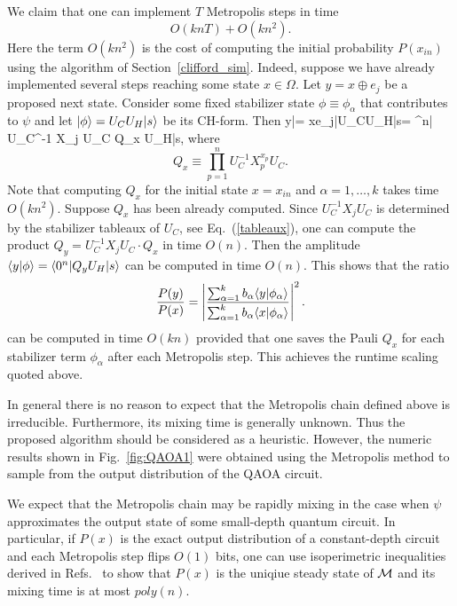 We claim that one can implement $T$ Metropolis  steps  in time 
\[
O(k n T) + O(k n^2). 
\]
Here the term $O(kn^2)$ is the cost of computing
the initial probability $P(x_{in})$ using the algorithm of Section~\ref{clifford_sim}.
Indeed, suppose we have already implemented
several steps  reaching some state $x\in \Omega$.
Let $y=x\oplus e_j$ be a proposed next state. 
Consider some fixed stabilizer state $\phi\equiv \phi_\alpha$ 
that contributes to $\psi$
and let $|\phi\rangle=U_C U_H |s\rangle$ be its CH-form.
Then
\be
\la y|\phi\ra=
\la x\oplus e_j|U_CU_H|s\ra = ^n| U_C^{-1} X_j U_C \cdot Q_x U_H|s\ra,
\ee
where 
\[
Q_x\equiv \prod_{p=1}^n U_C^{-1} X_p^{x_p} U_C.
\]
Note that computing $Q_x$ for the initial state 
$x=x_{in}$ and $\alpha=1,\ldots,k$ takes time
$O(kn^2)$. 
Suppose $Q_x$ has been already computed.
 Since $U_C^{-1} X_j U_C$
is determined by the stabilizer tableaux of $U_C$, see Eq.~(\ref{tableaux}),
one can compute the product $Q_y= U_C^{-1} X_j U_C \cdot Q_x$ in time $O(n)$. 
Then the amplitude $\langle y|\phi\rangle=\langle 0^n|Q_yU_H|s\rangle$ can be
computed in time $O(n)$. This shows that the ratio
\[
\frac{P(y)}{P(x)}=\left| \frac{\sum_{\alpha=1}^k b_\alpha \langle y|\phi_\alpha\rangle}
{\sum_{\alpha=1}^k b_\alpha \langle x|\phi_\alpha\rangle} \right|^2.
\]
can be computed in time $O(k n)$
provided that one saves the Pauli $Q_x$
for each stabilizer term $\phi_\alpha$ after each Metropolis step.
This  achieves the runtime scaling quoted above.


In general there is no reason to expect that the Metropolis chain defined above is
irreducible. Furthermore, its mixing time is generally unknown. 
Thus the proposed algorithm should be considered as a heuristic. However, the numeric
results shown in Fig.~\ref{fig:QAOA1} were obtained using the Metropolis
method to sample from the output distribution of the QAOA circuit.

We expect that the Metropolis chain  may be rapidly mixing 
in the case when $\psi$ approximates the output state of some small-depth quantum circuit.
In particular, if $P(x)$ is the exact output distribution of a constant-depth circuit
and each Metropolis step flips $O(1)$ bits, one can use isoperimetric inequalities
derived in Refs.~\cite{eldar2017local,crosson2017quantum} to show that 
$P(x)$ is the uniqiue steady state of ${\cal M }$
and its mixing time is at most $poly(n)$. 



